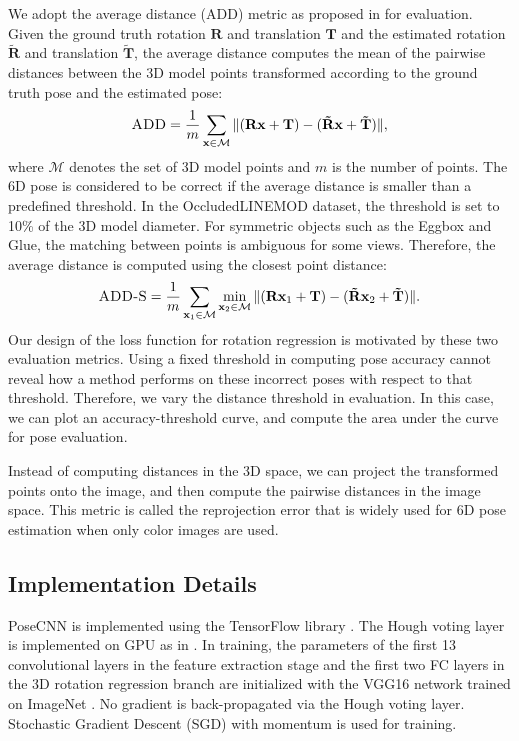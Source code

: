 \documentclass[conference]{IEEEtran}
\begin{document}
We adopt the average distance (ADD) metric as proposed in \cite{hinterstoisser2012model} for evaluation. Given the ground truth rotation $\mathbf{R}$ and translation $\mathbf{T}$ and the estimated rotation $\mathbf{\tilde{R}}$ and translation $\mathbf{\tilde{T}}$, the average distance computes the mean of the pairwise distances between the 3D model points transformed according to the ground truth pose and the estimated pose:
\begin{equation}
\textsc{ADD} = \frac{1}{m}\sum_{\mathbf{x} \in \mathcal{M}}\| (\mathbf{R} \mathbf{x} + \mathbf{T}) - (\mathbf{\tilde{R}} \mathbf{x} + \mathbf{\tilde{T}})  \|,
\end{equation}
where $\mathcal{M}$ denotes the set of 3D model points and $m$ is the number of points. The 6D pose is considered to be correct if the average distance is smaller than a predefined threshold. In the OccludedLINEMOD dataset, the threshold is set to 10\% of the 3D model diameter. For symmetric objects such as the Eggbox and Glue, the matching between points is ambiguous for some views. Therefore, the average distance is computed using the closest point distance:
\begin{equation} \label{eq::dsym}
\textsc{ADD-S} = \frac{1}{m}\sum_{\mathbf{x}_1 \in \mathcal{M}} \min_{\mathbf{x}_2 \in \mathcal{M}} \| (\mathbf{R} \mathbf{x}_1 + \mathbf{T}) - (\mathbf{\tilde{R}} \mathbf{x}_2 + \mathbf{\tilde{T}})  \|.
\end{equation}
Our design of the loss function for rotation regression is motivated by these two evaluation metrics. Using a fixed threshold in computing pose accuracy cannot reveal how a method performs on these incorrect poses with respect to that threshold. Therefore, we vary the distance threshold in evaluation. In this case, we can plot an accuracy-threshold curve, and compute the area under the curve for pose evaluation.

Instead of computing distances in the 3D space, we can project the transformed points onto the image, and then compute the pairwise distances in the image space. This metric is called the reprojection error that is widely used for 6D pose estimation when only color images are used.

\subsection{Implementation Details}

PoseCNN is implemented using the TensorFlow library \cite{abadi2016tensorflow}. The Hough voting layer is implemented on GPU as in \cite{van2011fast}. In training, the parameters of the first 13 convolutional layers in the feature extraction stage and the first two FC layers in the 3D rotation regression branch are initialized with the VGG16 network \cite{simonyan2014very} trained on ImageNet \cite{deng2009imagenet}. No gradient is back-propagated via the Hough voting layer. Stochastic Gradient Descent (SGD) with momentum is used for training.
\end{document}
